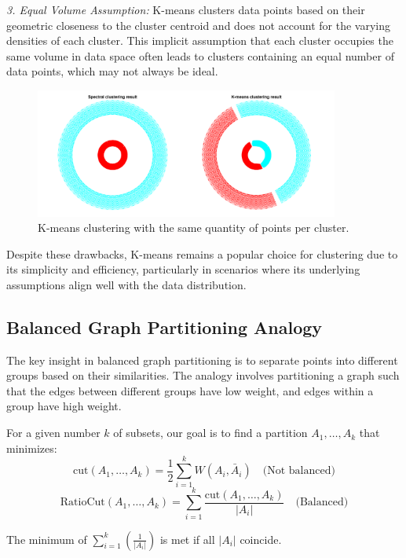 \documentclass[unicode,11pt,a4paper,oneside,numbers=endperiod,openany]{scrartcl}
\begin{document}
\textit{3. Equal Volume Assumption:}
K-means clusters data points based on their geometric closeness to the cluster centroid and does not account for the varying densities of each cluster. This implicit assumption that each cluster occupies the same volume in data space often leads to clusters containing an equal number of data points, which may not always be ideal.

\begin{figure}[H]
    \centering
    \includegraphics[trim=0cm 0cm 0cm 0cm, clip, width=10cm]{img3.png}
    \caption{K-means clustering with the same quantity of points per cluster.}
    \label{fig:img5}
\end{figure}

Despite these drawbacks, K-means remains a popular choice for clustering due to its simplicity and efficiency, particularly in scenarios where its underlying assumptions align well with the data distribution.


\subsection{Balanced Graph Partitioning Analogy}

The key insight in balanced graph partitioning is to separate points into different groups based on their similarities. The analogy involves partitioning a graph such that the edges between different groups have low weight, and edges within a group have high weight.

For a given number \( k \) of subsets, our goal is to find a partition \( A_1, \ldots, A_k \) that minimizes:
\[
\text{cut}(A_1, \ldots, A_k) = \frac{1}{2}\sum_{i=1}^{k} W(A_i, \bar{A}_i) \quad \text{(Not balanced)}
\]
\[
\text{RatioCut}(A_1, \ldots, A_k) = \sum_{i=1}^{k} \frac{\text{cut}(A_1, \ldots, A_k)}{|A_i|} \quad \text{(Balanced)}
\]

The minimum of \(\sum_{i=1}^{k}(\frac{1}{|A_i|})\) is met if all $|A_i|$ coincide.
\end{document}
